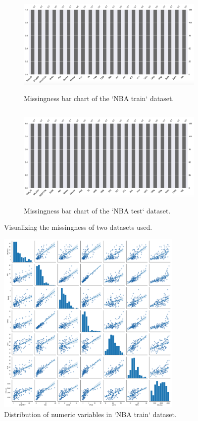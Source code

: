\documentclass[letterpaper,12pt,twoside,]{pinp}
\begin{document}
\begin{figure}
\begin{subfigure}{0.55\textwidth}
\includegraphics[width=0.9\linewidth, height=5cm]{nbaTrain_miss.png} 
\caption{Missingness bar chart of the `NBA train` dataset.}
\label{fig:trainMiss}
\end{subfigure}
\begin{subfigure}{0.55\textwidth}
\includegraphics[width=0.9\linewidth, height=5cm]{nbaTest_miss.png}
\caption{Missingness bar chart of the `NBA test` dataset.}
\label{fig:testMiss}
\end{subfigure}
\caption{Visualizing the missingness of two datasets used.}
\label{fig:missingness}
\end{figure}

\begin{figure}
\includegraphics[width=0.8\textwidth]{scatter.png}
\centering
\caption{Distribution of numeric variables in `NBA train` dataset.}
\label{fig:scatter}
\end{figure}
\end{document}
